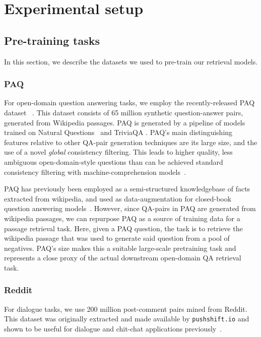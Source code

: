 \documentclass[11pt]{article}
\begin{document}
 
\section{Experimental setup}

\subsection{Pre-training tasks}
In this section, we describe the datasets we used to pre-train our retrieval models.
\subsubsection{PAQ}
For open-domain question answering tasks, we employ the recently-released PAQ dataset~ \citep{lewis2021paq}. 
This dataset consists of 65 million synthetic question-answer pairs, generated from Wikipedia passages.
PAQ is generated by a pipeline of models trained on Natural Questions~\cite[NQ][]{nq} and TriviaQA \cite[TQA][]{joshi-etal-2017-triviaqa}.
PAQ's main distinguishing features relative to other QA-pair generation techniques are its large size, and the use of a novel \emph{global} consistency filtering. 
This leads to higher quality, less ambiguous open-domain-style questions than can be achieved standard consistency filtering with machine-comprehension models~\cite{alberti_synthetic_2019}.


PAQ has previously been employed as a semi-structured knowledgebase of facts extracted from wikipedia, and used as data-augmentation for closed-book question answering models~\cite{t5close}.
However, since QA-pairs in PAQ are generated from wikipedia passages, we can repurpose PAQ as a source of training data for a passage retrieval task.
Here, given a PAQ question, the task is to retrieve the wikipedia passage that was used to generate said question from a pool of negatives.
PAQ's size makes this a suitable large-scale pretraining task and represents a close proxy of the actual downstream open-domain QA retrieval task.



\subsubsection{Reddit}
For dialogue tasks, we use 200 million post-comment pairs mined from Reddit.  This dataset was originally extracted and made available by \texttt{pushshift.io} and shown to be useful for dialogue and chit-chat applications previously~\citep{humeau2019poly,roller2020recipes}.
\end{document}
